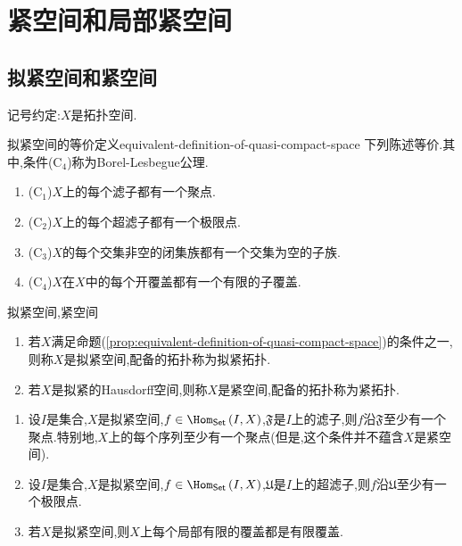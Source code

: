 \chapter{紧空间和局部紧空间}

\section{拟紧空间和紧空间}

记号约定:$X$是拓扑空间.

\begin{proposition}{拟紧空间的等价定义}{equivalent-definition-of-quasi-compact-space}
	下列陈述等价.其中,条件($\mathrm{C}_{4}$)称为Borel-Lesbegue公理.
	\begin{enumerate}
		\item ($\mathrm{C}_{1}$)$X$上的每个滤子都有一个聚点.
		\item ($\mathrm{C}_{2}$)$X$上的每个超滤子都有一个极限点.
		\item ($\mathrm{C}_{3}$)$X$的每个交集非空的闭集族都有一个交集为空的子族.
		\item ($\mathrm{C}_{4}$)$X$在$X$中的每个开覆盖都有一个有限的子覆盖.
	\end{enumerate}
\end{proposition}

\begin{definition}{拟紧空间,紧空间}{}
	\begin{enumerate}
		\item 若$X$满足命题(\ref{prop:equivalent-definition-of-quasi-compact-space})的条件之一,则称$X$是拟紧空间,配备的拓扑称为拟紧拓扑.
		\item 若$X$是拟紧的Hausdorff空间,则称$X$是紧空间,配备的拓扑称为紧拓扑.
	\end{enumerate}
\end{definition}

\begin{remark}{}{}
	\begin{enumerate}
		\item 设$I$是集合,$X$是拟紧空间,$f\in\Hom_{\mathsf{Set}}\left(I,X\right)$,$\mathfrak{F}$是$I$上的滤子,则$f$沿$\mathfrak{F}$至少有一个聚点.特别地,$X$上的每个序列至少有一个聚点(但是,这个条件并不蕴含$X$是紧空间).
		\item 设$I$是集合,$X$是拟紧空间,$f\in\Hom_{\mathsf{Set}}\left(I,X\right)$,$\mathfrak{U}$是$I$上的超滤子,则$f$沿$\mathfrak{U}$至少有一个极限点.
		\item 若$X$是拟紧空间,则$X$上每个局部有限的覆盖都是有限覆盖.
	\end{enumerate}
\end{remark}

